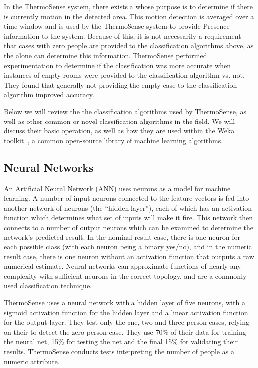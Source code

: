 \documentclass[../thesis/thesis.tex]{subfiles}
\begin{document}
In the ThermoSense system, there exists a \pir whose purpose is to determine if there is currently motion in the detected area. This motion detection is averaged over a time window and is used by the ThermoSense system to provide Presence information to the system. Because of this, it is not necessarily a requirement that cases with zero people are provided to the classification algorithms above, as the \pir alone can determine this information. ThermoSense performed experimentation to determine if the classification was more accurate when instances of empty rooms were provided to the classification algorithm vs. not. They found that generally not providing the empty case to the classification algorithm improved accuracy.

Below we will review the the classification algorithms used by ThermoSense, as well as other common or novel classification algorithms in the field. We will discuss their basic operation, as well as how they are used within the Weka toolkit~\cite{Weka}, a common open-source library of machine learning algorithms.

\subsection{Neural Networks}
An Artificial Neural Network (ANN) uses neurons as a model for machine learning. A number of input neurons connected to the feature vectors is fed into another network of neurons (the ``hidden layer''), each of which has an activation function which determines what set of inputs will make it fire. This network then connects to a number of output neurons which can be examined to determine the network's predicted result. In the nominal result case, there is one neuron for each possible class (with each neuron being a binary yes/no), and in the numeric result case, there is one neuron without an activation function that outputs a raw numerical estimate. Neural networks can approximate functions of nearly any complexity with sufficient neurons in the correct topology, and are a commonly used classification technique.

ThermoSense uses a neural network with a hidden layer of five neurons, with a sigmoid activation function for the hidden layer and a linear activation function for the output layer. They test only the one, two and three person cases, relying on their \pir to detect the zero person case. They use 70\% of their data for training the neural net, 15\% for testing the net and the final 15\% for validating their results. ThermoSense conducts tests interpreting the number of people as a numeric attribute.
\end{document}
